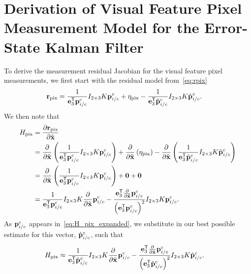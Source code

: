 \chapter{Derivation of Visual Feature Pixel Measurement Model for the Error-State Kalman Filter}
\label{apdx:estimation_pixel_meas_model}

To derive the measurement residual Jacobian for the visual feature pixel measurements, we
first start with the residual model from~\eqref{eq:rpix}
\begin{align}
  \mathrm{\mathbf{r}}_{\text{pix}}
  &= \frac{1}{\mathrm{\mathbf{e}}_3^{\mathsf{T}} \mathrm{\mathbf{p}}_{i/c}^c} I_{2 \times 3} K
  \mathrm{\mathbf{p}}_{i/c}^c + \mathrm{\mathbf{\eta}}_{\text{pix}} - \frac{1}{\mathrm{\mathbf{e}}_3^{\mathsf{T}} \hat{\mathrm{\mathbf{p}}}_{i/c}^c} I_{2 \times 3} K
  \hat{\mathrm{\mathbf{p}}}_{i/c}^c.
\end{align}
We then note that
\begin{align}
  H_{\text{pix}} &= \frac{ \partial \mathrm{\mathbf{r}}_{\text{pix}} }{ \partial \tilde{\mathrm{\mathbf{x}}}
  } \\
         &= \frac{ \partial }{ \partial \tilde{\mathrm{\mathbf{x}}}}
         \left( \frac{1}{\mathrm{\mathbf{e}}_3^{\mathsf{T}} \mathrm{\mathbf{p}}_{i/c}^c} I_{2 \times 3} K
         \mathrm{\mathbf{p}}_{i/c}^c \right) + \frac{ \partial }{ \partial \tilde{\mathrm{\mathbf{x}}}}
         \left( \mathrm{\mathbf{\eta}}_{\text{pix}} \right) - \frac{ \partial }{ \partial
           \tilde{\mathrm{\mathbf{x}}}} \left( \frac{1}{\mathrm{\mathbf{e}}_3^{\mathsf{T}} \hat{\mathrm{\mathbf{p}}}_{i/c}^c} I_{2 \times 3} K
         \hat{\mathrm{\mathbf{p}}}_{i/c}^c \right) \\
         &= \frac{ \partial }{ \partial \tilde{\mathrm{\mathbf{x}}}}
         \left( \frac{1}{\mathrm{\mathbf{e}}_3^{\mathsf{T}} \mathrm{\mathbf{p}}_{i/c}^c} I_{2 \times 3} K
         \mathrm{\mathbf{p}}_{i/c}^c \right) + \mathrm{\mathbf{0}} + \mathrm{\mathbf{0}} \\
          &= 
         \frac{1}{\mathrm{\mathbf{e}}_3^{\mathsf{T}} \mathrm{\mathbf{p}}_{i/c}^c} I_{2 \times 3} K
         \frac{\partial}{\partial \tilde{\mathrm{\mathbf{x}}}} \mathrm{\mathbf{p}}_{i/c}^c 
         - \frac{\mathrm{\mathbf{e}}_3^{\mathsf{T}} \frac{\partial}{\partial \tilde{\mathrm{\mathbf{x}}}} 
         \mathrm{\mathbf{p}}_{i/c}^c}{\left( \mathrm{\mathbf{e}}_3^{\mathsf{T}}
         \mathrm{\mathbf{p}}_{i/c}^c \right)^2 } I_{2 \times 3} K
          \mathrm{\mathbf{p}}_{i/c}^c. 
          \label{eq:H_pix_expanded}
\end{align}
As $\mathrm{\mathbf{p}}_{i/c}^c$ appears in~\eqref{eq:H_pix_expanded}, we substitute in our
best possible estimate for this vector, $\hat{\mathrm{\mathbf{p}}}_{i/c}^c$, such that
\begin{align}
  H_{\text{pix}} 
  &\approx
  \frac{1}{\mathrm{\mathbf{e}}_3^{\mathsf{T}} \hat{\mathrm{\mathbf{p}}}_{i/c}^c} I_{2 \times 3} K
 \frac{\partial}{\partial \tilde{\mathrm{\mathbf{x}}}} \mathrm{\mathbf{p}}_{i/c}^c 
 - \frac{\mathrm{\mathbf{e}}_3^{\mathsf{T}} \frac{\partial}{\partial \tilde{\mathrm{\mathbf{x}}}} 
 \mathrm{\mathbf{p}}_{i/c}^c}{\left( \mathrm{\mathbf{e}}_3^{\mathsf{T}}
 \hat{\mathrm{\mathbf{p}}}_{i/c}^c \right)^2 } I_{2 \times 3} K
 \hat{\mathrm{\mathbf{p}}}_{i/c}^c. 
\end{align}


